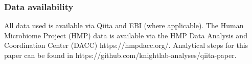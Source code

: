 \subsubsection{Data availability}

All data used is available via Qiita and EBI (where applicable).
The Human Microbiome Project (HMP) data is available via the HMP Data Analysis
and Coordination Center (DACC) https://hmpdacc.org/. Analytical steps for this
paper can be found in https://github.com/knightlab-analyses/qiita-paper.
